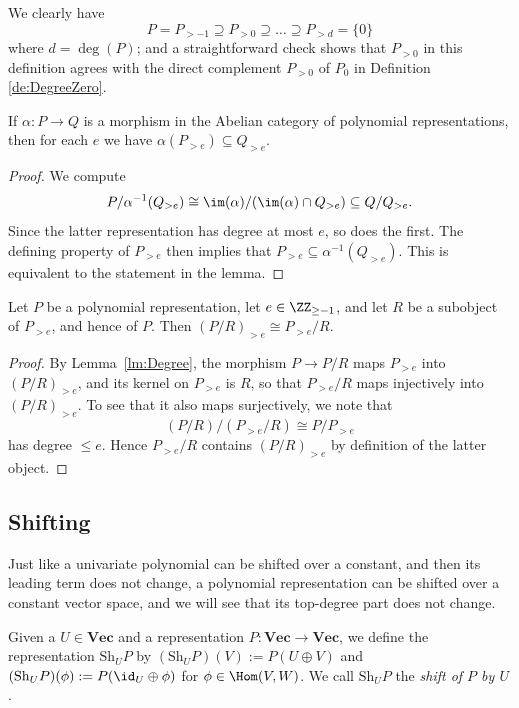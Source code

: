 \documentclass{amsart}
\renewcommand{\Vec}{\mathbf{Vec}}
\newcommand{\Sh}{\mathrm{Sh}}
\begin{document}
We clearly have 
\[ P=P_{>-1} \supseteq P_{> 0} \supseteq \dots \supseteq P_{>d}=\{0\}
\]
where $d=\deg(P)$; and a straightforward check shows that $P_{>0}$ in
this definition agrees with the direct complement $P_{>0}$ of $P_0$ in
Definition \ref{de:DegreeZero}. 

\begin{lm} \label{lm:Degree}
If $\alpha:P \to Q$ is a morphism in the Abelian category of polynomial
representations, then for each $e$ we have $\alpha(P_{>e}) \subseteq Q_{>e}$. 
\end{lm}

\begin{proof}
We compute
\[ P/\alpha^{-1}(Q_{>e}) \cong \im(\alpha)/(\im(\alpha) \cap Q_{>e})
\subseteq Q/Q_{>e}. \]
Since the latter representation has degree at most $e$, so does the first.
The defining property of $P_{>e}$ then implies that 
$P_{>e} \subseteq \alpha^{-1}(Q_{>e})$. This is equivalent to the
statement in the lemma. 
\end{proof}

\begin{lm} \label{lm:LargerSub}
Let $P$ be a polynomial representation, let $e \in \ZZ_{\geq -1}$, and let
$R$ be a subobject of $P_{>e}$, and hence of $P$. Then $(P/R)_{>e}
\cong P_{>e}/R$.
\end{lm}

\begin{proof}
By Lemma~\ref{lm:Degree}, the morphism $P \to P/R$ maps $P_{>e}$ into
$(P/R)_{>e}$, and its kernel on $P_{>e}$ is $R$, so that $P_{>e}/R$ maps
injectively into $(P/R)_{>e}$. To see that it also maps surjectively,
we note that
\[ (P/R)/(P_{>e}/R) \cong P/P_{>e} \]
has degree $\leq e$. Hence $P_{>e}/R$ contains $(P/R)_{>e}$ by
definition of the latter object.
\end{proof}

\subsection{Shifting} 

Just like a univariate polynomial can be shifted
over a constant, and then its leading term does not change, a
polynomial representation can be shifted over a constant vector space, and
we will see that its top-degree part does not change. 

\begin{de} \label{de:Shift}
Given a $U \in \Vec$ and a representation $P:\Vec \to \Vec$, we define the
representation $\Sh_U P$ by $(\Sh_U P)(V):=P(U \oplus V)$ and
$(\Sh_U P)(\phi):=P(\id_U \oplus \phi)$ for $\phi \in \Hom(V,W)$. We call
$\Sh_U P$ the {\em shift of $P$ by $U$}. 
\end{de}
\end{document}
